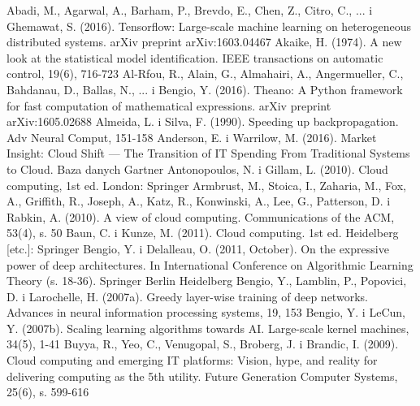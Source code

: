 \documentclass[12pt,a4paper,twoside]{article}
\begin{document}
\begin{thebibliography}{99}
\setlength{\itemsep}{0pt}%
 Abadi, M., Agarwal, A., Barham, P., Brevdo, E., Chen, Z., Citro, C., ... i Ghemawat, S. (2016). Tensorflow: Large-scale machine learning on heterogeneous distributed systems. arXiv preprint arXiv:1603.04467
 Akaike, H. (1974). A new look at the statistical model identification. IEEE transactions on automatic control, 19(6), 716-723
 Al-Rfou, R., Alain, G., Almahairi, A., Angermueller, C., Bahdanau, D., Ballas, N., ... i Bengio, Y. (2016). Theano: A Python framework for fast computation of mathematical expressions. arXiv preprint arXiv:1605.02688
 Almeida, L. i Silva, F. (1990). Speeding up backpropagation. Adv Neural Comput, 151-158
 Anderson, E. i Warrilow, M. (2016). Market Insight: Cloud Shift — The Transition of IT Spending From Traditional Systems to Cloud. Baza danych Gartner
 Antonopoulos, N. i Gillam, L. (2010). Cloud computing, 1st ed. London: Springer
 Armbrust, M., Stoica, I., Zaharia, M., Fox, A., Griffith, R., Joseph, A., Katz, R., Konwinski, A., Lee, G., Patterson, D. i Rabkin, A. (2010). A view of cloud computing. Communications of the ACM, 53(4), s. 50
 Baun, C. i Kunze, M. (2011). Cloud computing. 1st ed. Heidelberg [etc.]: Springer
 Bengio, Y. i Delalleau, O. (2011, October). On the expressive power of deep architectures. In International Conference on Algorithmic Learning Theory (s. 18-36). Springer Berlin Heidelberg
 Bengio, Y., Lamblin, P., Popovici, D. i Larochelle, H. (2007a). Greedy layer-wise training of deep networks. Advances in neural information processing systems, 19, 153
 Bengio, Y. i LeCun, Y. (2007b). Scaling learning algorithms towards AI. Large-scale kernel machines, 34(5), 1-41
 Buyya, R., Yeo, C., Venugopal, S., Broberg, J. i Brandic, I. (2009). Cloud computing and emerging IT platforms: Vision, hype, and reality for delivering computing as the 5th utility. Future Generation Computer Systems, 25(6), s. 599-616

\end{thebibliography}
\end{document}
